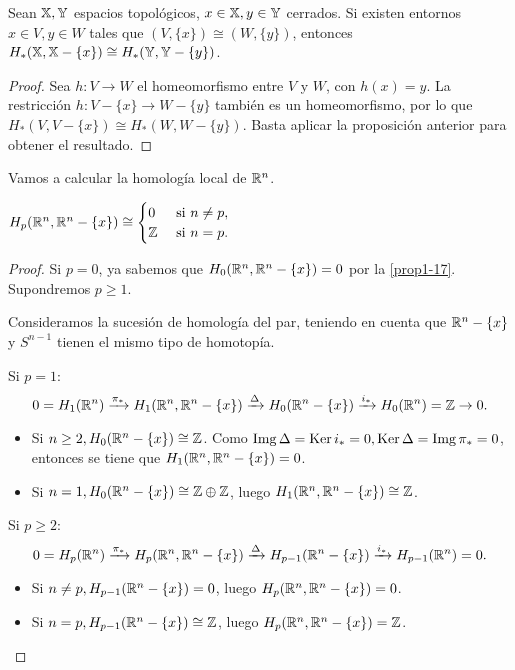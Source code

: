 \begin{proposition}
  Sean ${\mathbb X}, {\mathbb Y}$ espacios topológicos, $x \in {\mathbb X}, y \in {\mathbb Y}$ cerrados. Si existen entornos $x \in V, y \in W$ tales que $(V, \{x\}) \cong (W, \{y\})$,
  entonces $H_*({\mathbb X}, {\mathbb X} - \{x\}) \cong H_*({\mathbb Y}, {\mathbb Y} - \{y\})$.
\end{proposition}

\begin{proof}
  Sea $h \colon V \to W$ el homeomorfismo entre $V$ y $W$, con $h(x) = y$. La restricción $h \colon V - \{x\} \to W - \{y\}$ también es un homeomorfismo,
  por lo que $H_*(V, V - \{x\}) \cong H_*(W, W - \{y\})$. Basta aplicar la proposición anterior para obtener el resultado.
\end{proof}

Vamos a calcular la homología local de $\mathbb{R}^n$.

\begin{proposition}
  $H_p(\mathbb{R}^n, \mathbb{R}^n - \{x\}) \cong \begin{cases} 0 &\text{ si } n \neq p, \\ \mathbb{Z} &\text{ si } n = p. \end{cases}$
\end{proposition}

\begin{proof}
  Si $p = 0$, ya sabemos que $H_0(\mathbb{R}^n, \mathbb{R}^n - \{x\}) = 0$ por la \autoref{prop1-17}. Supondremos $p \geq 1$.

  Consideramos la sucesión de homología del par, teniendo en cuenta que $\mathbb{R}^n - \{x\}$ y $S^{n-1}$ tienen el mismo tipo de homotopía.

  Si $p = 1$:
  \[ 0 = H_1(\mathbb{R}^n) \xrightarrow{\pi_*} H_1(\mathbb{R}^n, \mathbb{R}^n - \{x\}) \xrightarrow{\Delta} H_0(\mathbb{R}^n - \{x\}) \xrightarrow{i_*} H_0(\mathbb{R}^n) = \mathbb{Z} \to 0. \]
  \begin{itemize}
    \item Si $n \geq 2, H_0(\mathbb{R}^n - \{x\}) \cong \mathbb{Z}$. Como $\operatorname{Img} \Delta = \operatorname{Ker} i_* = 0, \operatorname{Ker} \Delta = \operatorname{Img} \pi_* = 0$, entonces se tiene que
          $H_1(\mathbb{R}^n, \mathbb{R}^n - \{x\}) = 0$.
    \item Si $n = 1, H_0(\mathbb{R}^n - \{x\}) \cong \mathbb{Z} \oplus \mathbb{Z}$, luego $H_1(\mathbb{R}^n, \mathbb{R}^n - \{x\}) \cong \mathbb{Z}$.
  \end{itemize}

  Si $p \geq 2$:
  \[ 0 = H_p(\mathbb{R}^n) \xrightarrow{\pi_*} H_p(\mathbb{R}^n, \mathbb{R}^n - \{x\}) \xrightarrow{\Delta} H_{p-1}(\mathbb{R}^n - \{x\}) \xrightarrow{i_*} H_{p-1}(\mathbb{R}^n) = 0. \]
  \begin{itemize}
    \item Si $n \neq p, H_{p-1}(\mathbb{R}^n - \{x\}) = 0$, luego $H_p(\mathbb{R}^n, \mathbb{R}^n - \{x\}) = 0$.
    \item Si $n = p, H_{p-1}(\mathbb{R}^n - \{x\}) \cong \mathbb{Z}$, luego  $H_p(\mathbb{R}^n, \mathbb{R}^n - \{x\}) = \mathbb{Z}$.
  \end{itemize}
\end{proof}

